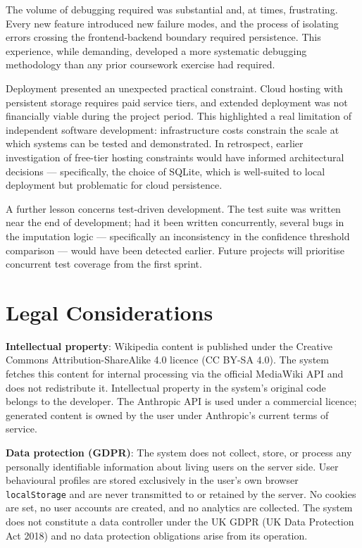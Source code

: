 \documentclass[11pt, a4paper]{report}
\begin{document}
The volume of debugging required was substantial and, at times, frustrating. Every new feature introduced new failure modes, and the process of isolating errors crossing the frontend-backend boundary required persistence. This experience, while demanding, developed a more systematic debugging methodology than any prior coursework exercise had required.

Deployment presented an unexpected practical constraint. Cloud hosting with persistent storage requires paid service tiers, and extended deployment was not financially viable during the project period. This highlighted a real limitation of independent software development: infrastructure costs constrain the scale at which systems can be tested and demonstrated. In retrospect, earlier investigation of free-tier hosting constraints would have informed architectural decisions — specifically, the choice of SQLite, which is well-suited to local deployment but problematic for cloud persistence.

A further lesson concerns test-driven development. The test suite was written near the end of development; had it been written concurrently, several bugs in the imputation logic — specifically an inconsistency in the confidence threshold comparison — would have been detected earlier. Future projects will prioritise concurrent test coverage from the first sprint.

\section{Legal Considerations}

\textbf{Intellectual property}: Wikipedia content is published under the Creative Commons Attribution-ShareAlike 4.0 licence (CC BY-SA 4.0). The system fetches this content for internal processing via the official MediaWiki API and does not redistribute it. Intellectual property in the system's original code belongs to the developer. The Anthropic API is used under a commercial licence; generated content is owned by the user under Anthropic's current terms of service.

\textbf{Data protection (GDPR)}: The system does not collect, store, or process any personally identifiable information about living users on the server side. User behavioural profiles are stored exclusively in the user's own browser \texttt{localStorage} and are never transmitted to or retained by the server. No cookies are set, no user accounts are created, and no analytics are collected. The system does not constitute a data controller under the UK GDPR (UK Data Protection Act 2018) and no data protection obligations arise from its operation.
\end{document}
